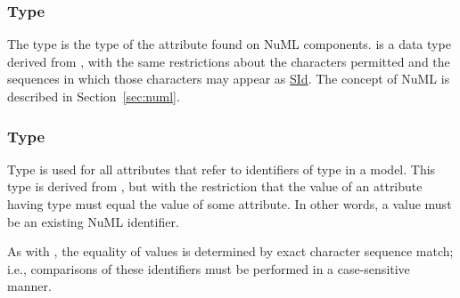 \subsubsection[\element{NuMLSId}]{Type }
\label{type:numlsid}
The type  is the type of the  attribute found on NuML components.  is a data type derived from \hyperref[type:sid]{}, with the same restrictions about the characters permitted and the sequences in which those characters may appear as \hyperref[type:sid]{SId}. The concept of NuML is described in Section~\ref{sec:numl}.

\subsubsection[\element{NuMLSIdRef}]{Type }
\label{type:numlsidref}
Type  is used for all attributes that refer to identifiers of type \hyperref[type:numlsid]{} in a model. This type is derived from \hyperref[type:numlsid]{}, but with the restriction that the value of an attribute having type  must equal the value of some \hyperref[type:numlsid]{} attribute. In other words, a  value must be an existing NuML identifier.

As with \hyperref[type:numlsid]{}, the equality of  values is determined by exact character sequence match; i.e., comparisons of these identifiers must be performed in a case-sensitive manner.

